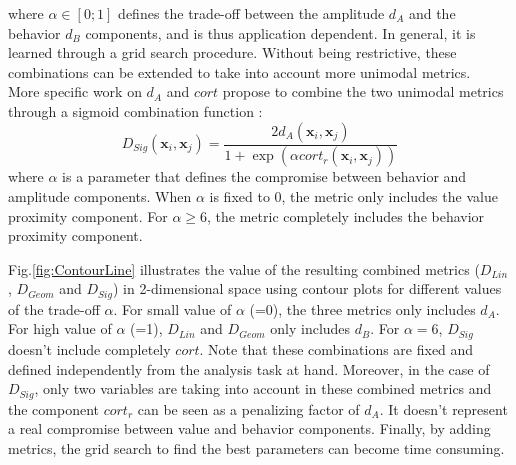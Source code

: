 \noindent where $\alpha \in [0;1]$ defines the trade-off between the amplitude $d_A$ and the behavior $d_B$ components, and is thus application dependent. In general, it is learned through a grid search procedure. Without being restrictive, these combinations can be extended to take into account more unimodal metrics. \\
More specific work on $d_A$ and $cort$ propose to combine the two unimodal metrics through a sigmoid combination function \cite{AhlameDouzal-Chouakria2011}:
\begin{equation}	
D_{Sig}(\textbf{x}_i,\textbf{x}_j) = \frac{2d_A(\textbf{x}_i,\textbf{x}_j)}{1+\exp(\alpha cort_r(\textbf{x}_i,\textbf{x}_j))}
\label{eq:DSig}
\end{equation}
\noindent where $\alpha$ is a parameter that defines the compromise between behavior and amplitude components. When $\alpha$ is fixed to 0, the metric only includes the value proximity component. For $\alpha \geq 6$, the metric completely includes the behavior proximity component. 

Fig.\ref{fig:ContourLine} illustrates the value of the resulting combined metrics ($D_{Lin}$, $D_{Geom}$ and $D_{Sig}$) in 2-dimensional space using contour plots for different values of the trade-off $\alpha$. For small value of $\alpha$ (=0), the three metrics only includes $d_A$. For high value of $\alpha$ (=1), $D_{Lin}$ and $D_{Geom}$ only includes $d_B$. For $\alpha=6$, $D_{Sig}$ doesn't include completely $cort$. Note that these combinations are fixed and defined independently from the analysis task at hand. Moreover, in the case of $D_{Sig}$, only two variables are taking into account in these combined metrics and the component $cort_r$ can be seen as a penalizing factor of $d_A$. It doesn't represent a real compromise between value and behavior components. Finally, by adding metrics, the grid search to find the best parameters can become time consuming.

